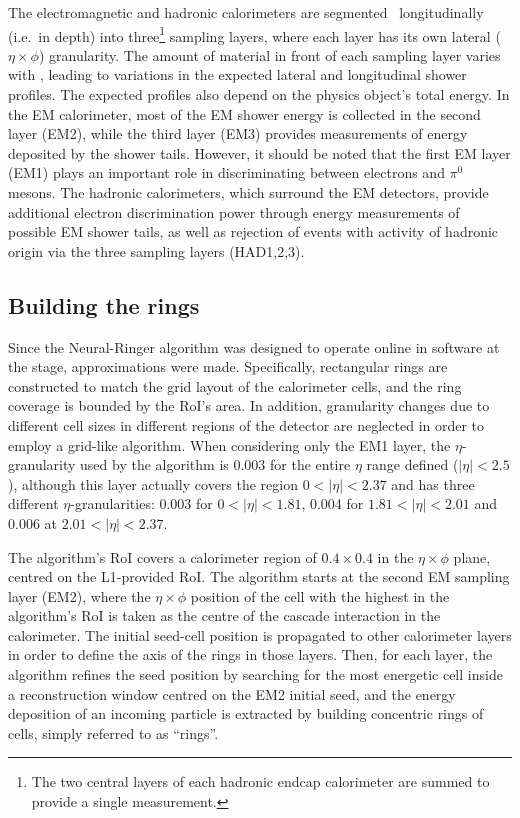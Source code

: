 The electromagnetic and hadronic calorimeters are segmented~\cite{PERF-2007-01} longitudinally (i.e.\ in depth) into three\footnote{The two central layers of each hadronic endcap calorimeter are summed to provide a single measurement.} sampling layers, where each layer has its own lateral ($\eta\times\phi$) granularity. The amount of material in front of each sampling layer varies with \abseta, leading to variations in the expected lateral and longitudinal shower profiles. The expected profiles also depend on the physics object's total energy. In the EM calorimeter, most of the EM shower energy is collected in the second layer (EM2), while the third layer (EM3) provides measurements of energy deposited by the shower tails. However, it should be noted that the first EM layer (EM1) plays an important role in discriminating between electrons and $\pi^0$ mesons. The hadronic calorimeters, which surround the EM detectors, provide additional electron discrimination power through energy measurements of possible EM shower tails, as well as rejection of events with activity of hadronic origin via the three sampling layers (HAD1,2,3). 


\subsection{Building the rings}\label{ssec:rnn_for_online_and_eletrons}


Since the Neural-Ringer algorithm was designed to operate online in software at the \fastcalo{} stage, approximations were made. Specifically, rectangular rings are constructed to match the grid layout of the calorimeter cells, and the ring coverage is bounded by the RoI's area. In addition, granularity changes due to different cell sizes in different regions of the detector are neglected in order to employ a grid-like algorithm. When considering only the EM1 layer, the $\eta$-granularity used by the algorithm is 0.003 for the entire $\eta$ range defined ($|\eta|<2.5$), although this layer actually covers the region $0<|\eta|<2.37$ and has three different $\eta$-granularities: 0.003 for $0<|\eta|<1.81$, 0.004 for $1.81<|\eta|<2.01$ and 0.006 at $2.01<|\eta|<2.37$.


The algorithm's RoI covers a calorimeter region of $0.4\times0.4$ in the $\eta\times\phi$ plane, centred on the L1-provided RoI. 
The algorithm starts at the second EM sampling layer (EM2), where the $\eta\times\phi$ position of the cell with the highest \ET in the algorithm's RoI is taken as the centre of the cascade interaction in the calorimeter. The initial seed-cell position is propagated to other calorimeter layers in order to define the axis of the rings in those layers. Then, for each layer, the algorithm refines the seed position by searching for the most energetic cell inside a reconstruction window centred on the EM2 initial seed, and the energy deposition of an incoming particle is extracted by building concentric rings of cells, simply referred to as \enquote{rings}. 

